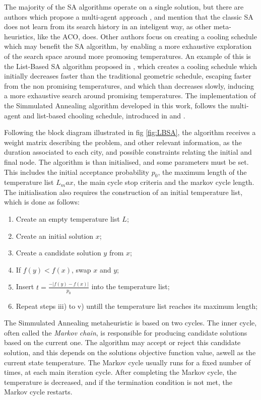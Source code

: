 The majority of the SA algorithms operate on a single solution, but there are
authors which propose a multi-agent approach \cite{multi_agent_SA}, and mention
that the classic SA does not learn from its search history in an inteligent way,
as other meta-heuristics, like the ACO, does. Other authors focus on creating a
cooling schedule which may benefit the SA algorithm, by enabling a more
exhaustive exploration of the search space around more promosing temperatures.
An example of this is the List-Based SA algorithm proposed in
\cite{list_based_SA}, which creates a cooling schedule which initially decreases
faster than the traditional geometric schedule, escaping faster from the non
promising temperatures, and which than decreases slowly, inducing a more
exhaustive search around promising temperatures. The implementation of the
Simmulated Annealing algorithm developed in this work, follows the multi-agent
and list-based chooling schedule, introduced in \cite{multi_agent_SA} and
\cite{list_based_SA}.

Following the block diagram illustrated in fig \ref{fig:LBSA}, the algorithm
receives a weight matrix describing the problem, and other relevant information,
as the duration associated to each city, and possible constraints relating the
initial and final node. The algorithm is than initialised, and some parameters
must be set. This includes the initial acceptance probability $p_0$, the maximum
length of the temperature list $L_max$, the main cycle stop criteria and the
markov cycle length. The initialisation also requires the construction of an
initial temperature list, which is done as follows: 

\begin{enumerate}[noitemsep,topsep=0pt,parsep=0pt,partopsep=0pt]
  \item Create an empty temperature list $L$;
  \item Create an initial solution $x$; 
  \item Create a candidate solution $y$ from $x$;
  \item If $f(y) < f(x)$, swap $x$ and $y$;
  \item Insert $t = \frac{-|f(y)-f(x)|}{p_0}$ into the temperature list;
  \item Repeat steps iii) to v) untill the temperature list reaches its maximum
  length;  
\end{enumerate}


The Simmulated Annealing metaheuristic is based on two cycles. The inner cycle,
often called the \textit{Markov chain}, is responsible for producing candidate
solutions based on the current one. The algorithm may accept or reject this
candidate solution, and this depends on the solutions objective function value,
aswell as the current state temperature. The Markov cycle usually runs for a
fixed number of times, at each main iteration cycle. After completing the Markov
cycle, the temperature is decreased, and if the termination condition is not
met, the Markov cycle restarts.

